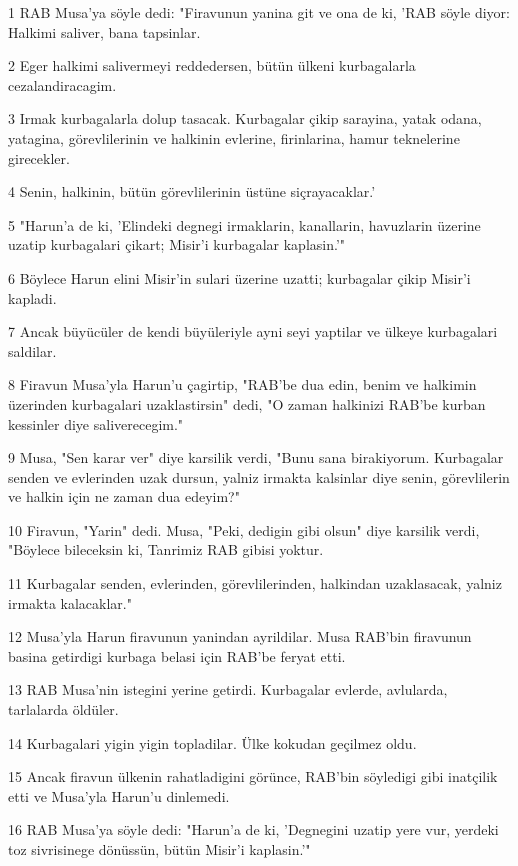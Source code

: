 \par 1 RAB Musa'ya söyle dedi: "Firavunun yanina git ve ona de ki, 'RAB söyle diyor: Halkimi saliver, bana tapsinlar.
\par 2 Eger halkimi salivermeyi reddedersen, bütün ülkeni kurbagalarla cezalandiracagim.
\par 3 Irmak kurbagalarla dolup tasacak. Kurbagalar çikip sarayina, yatak odana, yatagina, görevlilerinin ve halkinin evlerine, firinlarina, hamur teknelerine girecekler.
\par 4 Senin, halkinin, bütün görevlilerinin üstüne siçrayacaklar.'
\par 5 "Harun'a de ki, 'Elindeki degnegi irmaklarin, kanallarin, havuzlarin üzerine uzatip kurbagalari çikart; Misir'i kurbagalar kaplasin.'"
\par 6 Böylece Harun elini Misir'in sulari üzerine uzatti; kurbagalar çikip Misir'i kapladi.
\par 7 Ancak büyücüler de kendi büyüleriyle ayni seyi yaptilar ve ülkeye kurbagalari saldilar.
\par 8 Firavun Musa'yla Harun'u çagirtip, "RAB'be dua edin, benim ve halkimin üzerinden kurbagalari uzaklastirsin" dedi, "O zaman halkinizi RAB'be kurban kessinler diye saliverecegim."
\par 9 Musa, "Sen karar ver" diye karsilik verdi, "Bunu sana birakiyorum. Kurbagalar senden ve evlerinden uzak dursun, yalniz irmakta kalsinlar diye senin, görevlilerin ve halkin için ne zaman dua edeyim?"
\par 10 Firavun, "Yarin" dedi. Musa, "Peki, dedigin gibi olsun" diye karsilik verdi, "Böylece bileceksin ki, Tanrimiz RAB gibisi yoktur.
\par 11 Kurbagalar senden, evlerinden, görevlilerinden, halkindan uzaklasacak, yalniz irmakta kalacaklar."
\par 12 Musa'yla Harun firavunun yanindan ayrildilar. Musa RAB'bin firavunun basina getirdigi kurbaga belasi için RAB'be feryat etti.
\par 13 RAB Musa'nin istegini yerine getirdi. Kurbagalar evlerde, avlularda, tarlalarda öldüler.
\par 14 Kurbagalari yigin yigin topladilar. Ülke kokudan geçilmez oldu.
\par 15 Ancak firavun ülkenin rahatladigini görünce, RAB'bin söyledigi gibi inatçilik etti ve Musa'yla Harun'u dinlemedi.
\par 16 RAB Musa'ya söyle dedi: "Harun'a de ki, 'Degnegini uzatip yere vur, yerdeki toz sivrisinege dönüssün, bütün Misir'i kaplasin.'"
